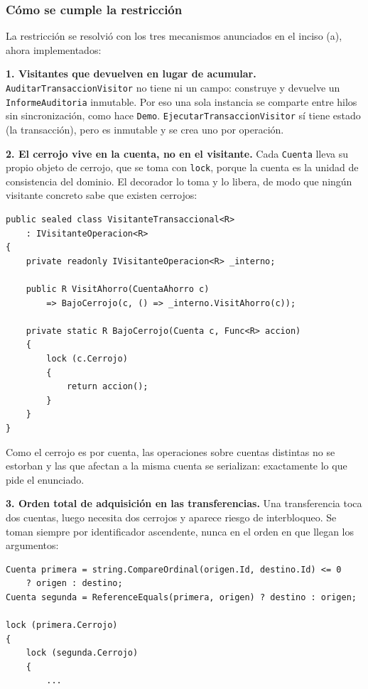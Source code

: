 \subsubsection*{Cómo se cumple la restricción}

La restricción se resolvió con los tres mecanismos anunciados en el inciso (a), ahora
implementados:

\textbf{1. Visitantes que devuelven en lugar de acumular.}
\texttt{AuditarTransaccionVisitor} no tiene ni un campo: construye y devuelve un
\texttt{InformeAuditoria} inmutable. Por eso una sola instancia se comparte entre hilos sin
sincronización, como hace \texttt{Demo}. \texttt{EjecutarTransaccionVisitor} sí tiene estado
(la transacción), pero es inmutable y se crea uno por operación.

\textbf{2. El cerrojo vive en la cuenta, no en el visitante.} Cada \texttt{Cuenta} lleva su
propio objeto de cerrojo, que se toma con \texttt{lock}, porque la cuenta es la unidad de
consistencia del dominio. El decorador
lo toma y lo libera, de modo que ningún visitante concreto sabe que existen cerrojos:

{\small
\begin{verbatim}
public sealed class VisitanteTransaccional<R>
    : IVisitanteOperacion<R>
{
    private readonly IVisitanteOperacion<R> _interno;

    public R VisitAhorro(CuentaAhorro c)
        => BajoCerrojo(c, () => _interno.VisitAhorro(c));

    private static R BajoCerrojo(Cuenta c, Func<R> accion)
    {
        lock (c.Cerrojo)
        {
            return accion();
        }
    }
}
\end{verbatim}
}

Como el cerrojo es por cuenta, las operaciones sobre cuentas distintas no se estorban y las
que afectan a la misma cuenta se serializan: exactamente lo que pide el enunciado.

\textbf{3. Orden total de adquisición en las transferencias.} Una transferencia toca dos
cuentas, luego necesita dos cerrojos y aparece riesgo de interbloqueo. Se toman siempre por
identificador ascendente, nunca en el orden en que llegan los argumentos:

{\small
\begin{verbatim}
Cuenta primera = string.CompareOrdinal(origen.Id, destino.Id) <= 0
    ? origen : destino;
Cuenta segunda = ReferenceEquals(primera, origen) ? destino : origen;

lock (primera.Cerrojo)
{
    lock (segunda.Cerrojo)
    {
        ...
\end{verbatim}
}

